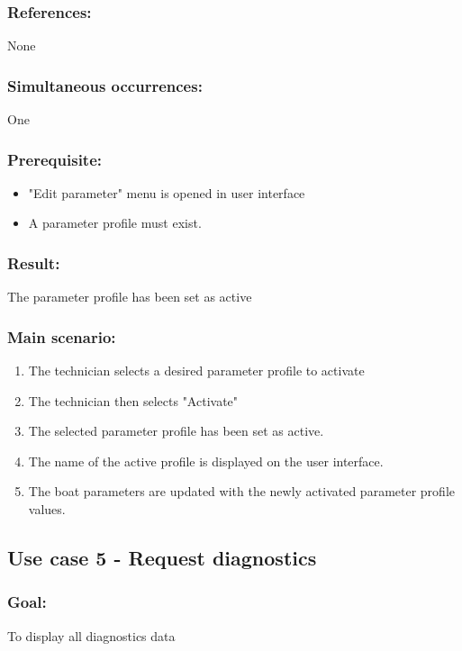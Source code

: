 \subsubsection*{References:}
None

\subsubsection*{Simultaneous occurrences:}
One

\subsubsection*{Prerequisite:}
\begin{itemize}
	\item "Edit parameter" menu is opened in user interface
	\item A parameter profile must exist.
\end{itemize}

\subsubsection*{Result:}
The parameter profile has been set as active

\subsubsection*{Main scenario:}
\begin{enumerate}
	\item The technician selects a desired parameter profile to activate
	\item The technician then selects "Activate"
	\item The selected parameter profile has been set as active.
	\item The name of the active profile is displayed on the user interface.
	\item The boat parameters are updated with the newly activated parameter profile values.
\end{enumerate}


\subsection{Use case 5 - Request diagnostics}
\subsubsection*{Goal:}
To display all diagnostics data

